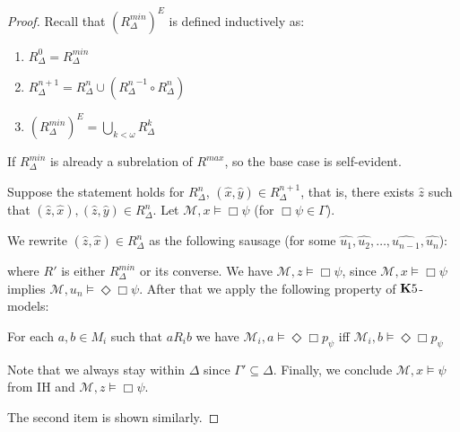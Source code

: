 \documentclass[a4paper]{article}
\theoremstyle{defin}
\theoremstyle{theorem}
\theoremstyle{prop}
\theoremstyle{lemma}
\theoremstyle{fact}
\theoremstyle{ex}
\theoremstyle{col}
\theoremstyle{claim}
\begin{document}
\begin{proof}
  Recall that $(R^{min}_{\Delta})^{E}$ is defined inductively as:
  \begin{enumerate}
    \item $R_{\Delta}^{0} = R_{\Delta}^{min}$
    \item $R_{\Delta}^{n + 1} = R_{\Delta}^{n} \cup ({R_{\Delta}^{n}}^{-1} \circ R_{\Delta}^{n})$
    \item $(R^{min}_{\Delta})^{E} = \bigcup_{k < \omega} R_{\Delta}^{k}$
  \end{enumerate}

  If $R^{min}_{\Delta}$ is already a subrelation of $R^{max}$, so the base case is self-evident.

  Suppose the statement holds for $R_{\Delta}^{n}$, $(\hat{x},\hat{y}) \in R_{\Delta}^{n + 1}$, that is, there exists $\hat{z}$ such that $(\hat{z}, \hat{x}), (\hat{z}, \hat{y}) \in R_{\Delta}^{n}$.
  Let $\mathcal{M}, x \models \Box \psi$ (for $\Box \psi \in \Gamma$).

  We rewrite $(\hat{z}, \hat{x}) \in R_{\Delta}^{n}$ as the following sausage (for some $\widehat{u_1},  \widehat{u_2}, \dots, \widehat{u_{n - 1}}, \widehat{u_{n}}$):

  where $R'$ is either $R_{\Delta}^{min}$ or its converse. We have $\mathcal{M}, z \models \Box \psi$, since $\mathcal{M}, x \models \Box \psi$ implies $\mathcal{M}, u_{n} \models \Diamond \Box \psi$. After that we apply the following property of ${\bf K}5$-models:
  \begin{center}
    For each $a, b \in M_i$ such that $a R_i b$ we have $\mathcal{M}_i, a \models \Diamond \Box p_{\psi}$ iff $\mathcal{M}_i, b \models \Diamond \Box p_{\psi}$
  \end{center}
  Note that we always stay within $\Delta$ since $\Gamma' \subseteq \Delta$.
  Finally, we conclude $\mathcal{M}, x \models \psi$ from IH and $\mathcal{M}, z \models \Box \psi$.

  The second item is shown similarly.
\end{proof}
\end{document}
